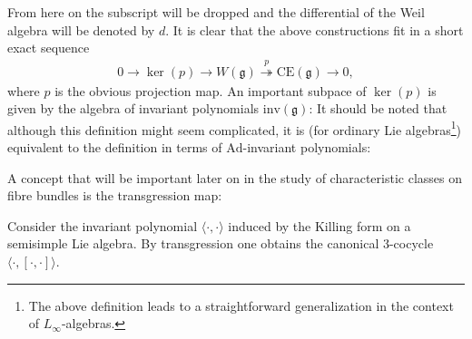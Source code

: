     From here on the subscript will be dropped and the differential of the Weil algebra will be denoted by $d$. It is clear that the above constructions fit in a short exact sequence
    \begin{gather}
        \label{lie:weil_algebra_sequence}
        0\rightarrow\ker(p)\rightarrow W(\mathfrak{g})\overset{p}{\twoheadrightarrow}\mathrm{CE}(\mathfrak{g})\rightarrow0,
    \end{gather}
    where $p$ is the obvious projection map. An important subpace of $\ker(p)$ is given by the algebra of invariant polynomials $\mathrm{inv}(\mathfrak{g})$:
    It should be noted that although this definition might seem complicated, it is (for ordinary Lie algebras\footnote{The above definition leads to a straightforward generalization in the context of $L_\infty$-algebras.}) equivalent to the definition in terms of $\mathrm{Ad}$-invariant polynomials:

    A concept that will be important later on in the study of characteristic classes on fibre bundles is the transgression map:
    \begin{example}\label{lie:killing_transgression}
        Consider the invariant polynomial $\langle\cdot,\cdot\rangle$ induced by the Killing form on a semisimple Lie algebra. By transgression one obtains the canonical 3-cocycle $\langle\cdot,[\cdot,\cdot]\rangle$.
    \end{example}